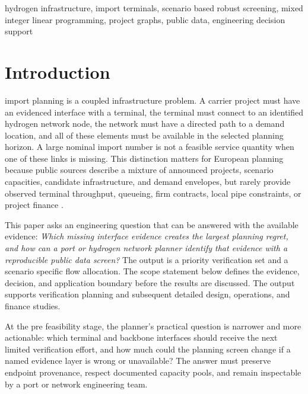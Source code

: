 \documentclass{ieeeaccess}
\begin{document}
\begin{keywords}
hydrogen infrastructure, import terminals, scenario based robust screening, mixed integer linear programming, project graphs, public data, engineering decision support
\end{keywords}

\titlepgskip=-21pt
\maketitle

\section{Introduction}
\label{sec:introduction}

 import planning is a coupled infrastructure problem. A carrier project must have an evidenced interface with a terminal, the terminal must connect to an identified hydrogen network node, the network must have a directed path to a demand location, and all of these elements must be available in the selected planning horizon. A large nominal import number is not a feasible service quantity when one of these links is missing. This distinction matters for European planning because public sources describe a mixture of announced projects, scenario capacities, candidate infrastructure, and demand envelopes, but rarely provide observed terminal throughput, queueing, firm contracts, local pipe constraints, or project finance \cite{EC_REPowerEU,REDIII,HydrogenRegulation,HydrogenDirective,TENE,FuelEUMaritime}.

This paper asks an engineering question that can be answered with the available evidence: \emph{Which missing interface evidence creates the largest planning regret, and how can a port or hydrogen network planner identify that evidence with a reproducible public data screen?} The output is a priority verification set and a scenario specific flow allocation. The scope statement below defines the evidence, decision, and application boundary before the results are discussed. The output supports verification planning and subsequent detailed design, operations, and finance studies.

At the pre feasibility stage, the planner's practical question is narrower and more actionable: which terminal and backbone interfaces should receive the next limited verification effort, and how much could the planning screen change if a named evidence layer is wrong or unavailable? The answer must preserve endpoint provenance, respect documented capacity pools, and remain inspectable by a port or network engineering team.
\end{document}

